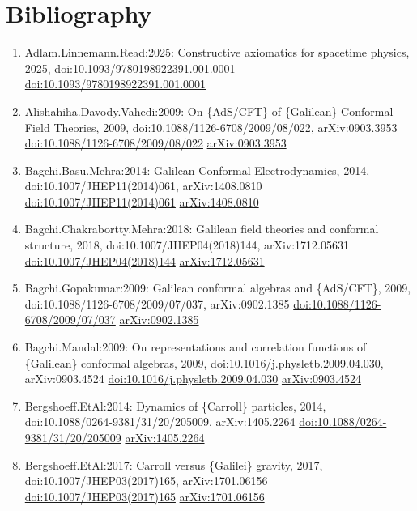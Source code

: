 \documentclass[11pt]{article}
\begin{document}
\section*{Bibliography}
\begin{enumerate}[leftmargin=*]
  \item Adlam.Linnemann.Read:2025: Constructive axiomatics for spacetime physics, 2025, doi:10.1093/9780198922391.001.0001 \href{https://doi.org/10.1093/9780198922391.001.0001}{doi:10.1093/9780198922391.001.0001}
  \item Alishahiha.Davody.Vahedi:2009: On \{AdS/CFT\} of \{Galilean\} Conformal Field Theories, 2009, doi:10.1088/1126-6708/2009/08/022, arXiv:0903.3953 \href{https://doi.org/10.1088/1126-6708/2009/08/022}{doi:10.1088/1126-6708/2009/08/022} \href{https://arxiv.org/abs/0903.3953}{arXiv:0903.3953}
  \item Bagchi.Basu.Mehra:2014: Galilean Conformal Electrodynamics, 2014, doi:10.1007/JHEP11(2014)061, arXiv:1408.0810 \href{https://doi.org/10.1007/JHEP11(2014)061}{doi:10.1007/JHEP11(2014)061} \href{https://arxiv.org/abs/1408.0810}{arXiv:1408.0810}
  \item Bagchi.Chakrabortty.Mehra:2018: Galilean field theories and conformal structure, 2018, doi:10.1007/JHEP04(2018)144, arXiv:1712.05631 \href{https://doi.org/10.1007/JHEP04(2018)144}{doi:10.1007/JHEP04(2018)144} \href{https://arxiv.org/abs/1712.05631}{arXiv:1712.05631}
  \item Bagchi.Gopakumar:2009: Galilean conformal algebras and \{AdS/CFT\}, 2009, doi:10.1088/1126-6708/2009/07/037, arXiv:0902.1385 \href{https://doi.org/10.1088/1126-6708/2009/07/037}{doi:10.1088/1126-6708/2009/07/037} \href{https://arxiv.org/abs/0902.1385}{arXiv:0902.1385}
  \item Bagchi.Mandal:2009: On representations and correlation functions of \{Galilean\} conformal algebras, 2009, doi:10.1016/j.physletb.2009.04.030, arXiv:0903.4524 \href{https://doi.org/10.1016/j.physletb.2009.04.030}{doi:10.1016/j.physletb.2009.04.030} \href{https://arxiv.org/abs/0903.4524}{arXiv:0903.4524}
  \item Bergshoeff.EtAl:2014: Dynamics of \{Carroll\} particles, 2014, doi:10.1088/0264-9381/31/20/205009, arXiv:1405.2264 \href{https://doi.org/10.1088/0264-9381/31/20/205009}{doi:10.1088/0264-9381/31/20/205009} \href{https://arxiv.org/abs/1405.2264}{arXiv:1405.2264}
  \item Bergshoeff.EtAl:2017: Carroll versus \{Galilei\} gravity, 2017, doi:10.1007/JHEP03(2017)165, arXiv:1701.06156 \href{https://doi.org/10.1007/JHEP03(2017)165}{doi:10.1007/JHEP03(2017)165} \href{https://arxiv.org/abs/1701.06156}{arXiv:1701.06156}

\end{enumerate}
\end{document}
